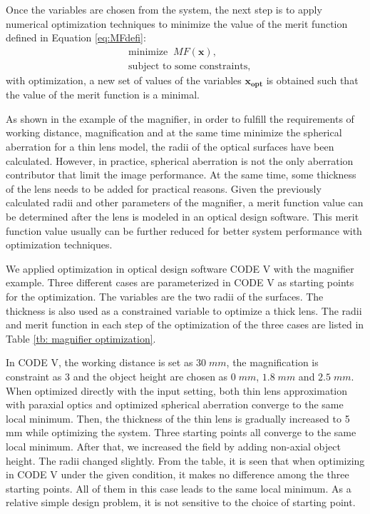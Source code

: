 Once the variables are chosen from the system, the next step is to apply numerical optimization techniques to minimize the value of the merit function defined in Equation \ref{eq:MFdefi}:
\begin{equation} \label{eq:MFopt_cp1}
\begin{split}
& \text{minimize}\;\; MF(\pmb{x}) ,\\
& \text{subject to some constraints},
\end{split}
\end{equation}
with optimization, a new set of values of the variables $\pmb{x_{opt}}$ is obtained such that the value of the merit function is a minimal.

As shown in the example of the magnifier, in order to fulfill the requirements of working distance, magnification and at the same time minimize the spherical aberration for a thin lens model, the radii of the optical surfaces have been calculated. However, in practice, spherical aberration is not the only aberration contributor that limit the image performance. At the same time, some thickness of the lens needs to be added for practical reasons. Given the previously calculated radii and other parameters of the magnifier, a merit function value can be determined after the lens is modeled in an optical design software. This merit function value usually can be further reduced for better system performance with optimization techniques.  

We applied optimization in optical design software CODE V with the magnifier example. Three different cases are parameterized in CODE V as starting points for the optimization. The variables are the two radii of the surfaces. The thickness is also used as a constrained variable to optimize a thick lens. The radii and merit function in each step of the optimization of the three cases are listed in Table \ref{tb: magnifier optimization}. 

In CODE V, the working distance is set as $30 \; mm$,  the magnification is constraint as $3$ and the object height are chosen as $0 \; mm$, $1.8 \; mm$ and $2.5 \; mm$. When optimized directly with the input setting, both thin lens approximation with paraxial optics and optimized spherical aberration converge to the same local minimum. Then, the thickness of the thin lens is gradually increased to 5 mm while optimizing the system. Three starting points all converge to the same local minimum. After that, we increased the field by adding non-axial object height. The radii changed slightly. From the table, it is seen that when optimizing in CODE V under the given condition, it makes no difference among the three starting points. All of  them in this case leads to the same local minimum. As a relative simple design problem, it is not sensitive to the choice of starting point.

